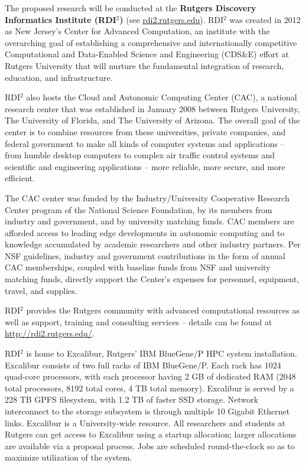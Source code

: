 
\noindent The proposed research will be conducted at the {\bf Rutgers Discovery Informatics Institute  (RDI$^2$)} (see \url{rdi2.rutgers.edu}). RDI$^2$ was created in 2012 as New Jersey's Center for Advanced Computation, an institute with the overarching goal of establishing a comprehensive and internationally competitive Computational and Data-Enabled Science and Engineering (CDS\&E) effort at Rutgers University that will nurture the fundamental integration of research, education, and infrastructure. 

RDI$^2$ also hosts the Cloud and Autonomic Computing Center (CAC), a national research center that was established in January 2008 between Rutgers University, The University of Florida, and The University of Arizona.  The overall goal of the center is to combine resources from these universities, private companies, and federal government to make all kinds of computer systems and applications -- from humble desktop computers to complex air traffic control systems and scientific and engineering applications -- more reliable, more secure, and more efficient. 

The CAC center was funded by the Industry/University Cooperative Research Center program of the National Science Foundation, by its members from industry and government, and by university matching funds. CAC members are afforded access to leading edge developments in autonomic computing and to knowledge accumulated by academic researchers and other industry partners. Per NSF guidelines, industry and government contributions in the form of annual CAC memberships, coupled with baseline funds from NSF and university matching funds, directly support the Center's expenses for personnel, equipment, travel, and supplies. 

RDI$^2$ provides the Rutgers community with advanced computational resources as well as support, training and consulting services -- details can be found at \url{http://rdi2.rutgers.edu/}.

RDI$^2$ is home to Excalibur, Rutgers' IBM BlueGene/P HPC system installation.  Excalibur consists of two full racks of IBM BlueGene/P.  Each rack has 1024 quad-core processors, with each processor having 2 GB of dedicated RAM (2048 total processors, 8192 total cores, 4 TB total memory).  Excalibur is served by a 228 TB GPFS filesystem, with 1.2 TB of faster SSD storage.  Network interconnect to the storage subsystem is through multiple 10 Gigabit Ethernet links.  Excalibur is a University-wide resource.  All researchers and students at Rutgers can get access to Excalibur using a startup allocation; larger allocations are available via a proposal process. Jobs are scheduled round-the-clock so as to maximize utilization of the system.  


